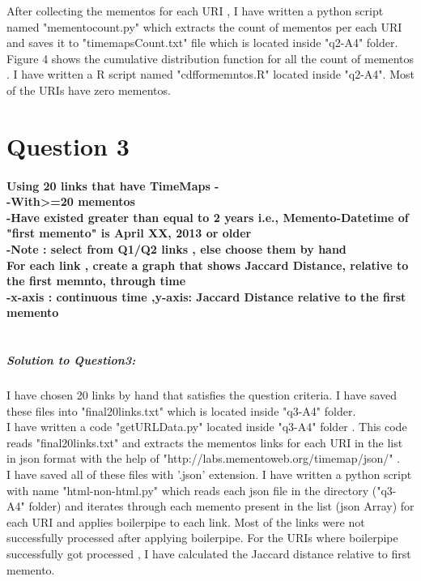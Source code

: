 \documentclass[12pt]{Report}
\begin{document}
After collecting the mementos for each URI , I have written a python script named "mementocount.py" which extracts the count of mementos per each URI and saves it to "timemapsCount.txt" file which is located inside "q2-A4" folder.\\
 

Figure 4 shows the cumulative distribution function for all the count of mementos . I have written a R script named "cdfformemntos.R" located inside "q2-A4".  Most of the URIs have zero mementos. \\


\section{Question 3\\}

\paragraph{Using 20 links that have TimeMaps - \\ -With>=20 mementos\\-Have existed greater than equal to 2 years i.e., Memento-Datetime of "first memento" is April XX, 2013 or older\\ -Note : select from Q1/Q2  links , else choose them by hand \\ For each link , create a graph that shows Jaccard Distance, relative to the first memnto, through time\\-x-axis : continuous time ,y-axis: Jaccard Distance relative to the first memento \\\\ }


\subparagraph{Solution to Question3: \\}

I have chosen 20 links by hand  that satisfies the question criteria. I have saved these files into "final20links.txt" which is located inside "q3-A4" folder.\\
I have written a code "getURLData.py" located inside "q3-A4" folder . This code reads "final20links.txt" and extracts the mementos links for each URI in the list in json format with the help of "http://labs.mementoweb.org/timemap/json/" . \\

I have saved all of these files with '.json' extension.  I have written a python script with name "html-non-html.py" which reads each json file in the directory  ("q3-A4" folder) and iterates through each memento present in the  list (json Array)  for each URI and applies boilerpipe to each link.
Most of the links were not successfully processed after applying boilerpipe. For the URIs where boilerpipe successfully got processed , I have calculated the Jaccard distance relative to first memento.\\
\end{document}
